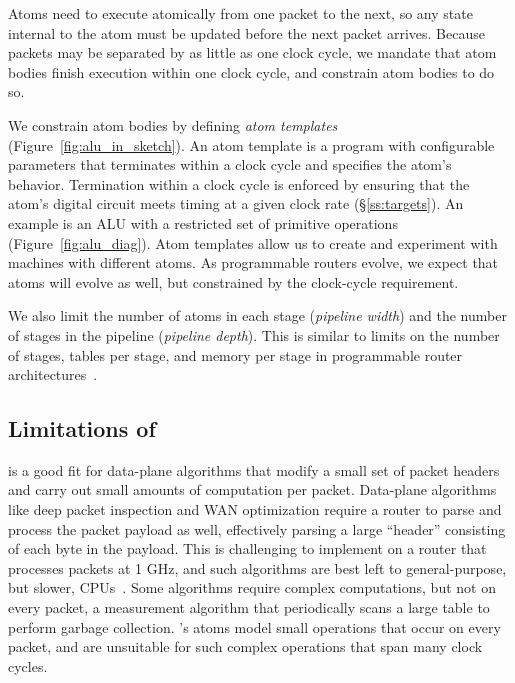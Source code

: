  Atoms need to execute atomically from one
packet to the next, so any state internal to the atom must be updated before
the next packet arrives.  Because packets may be separated by as little as one
clock cycle, we mandate that atom bodies finish execution within one clock
cycle, and constrain atom bodies to do so.

We constrain atom bodies by defining {\it atom templates}
(Figure~\ref{fig:alu_in_sketch}).  An atom template is a program with configurable
parameters that terminates within a clock cycle and specifies the atom's
behavior.  Termination within a clock cycle is enforced by ensuring that the
atom's digital circuit meets timing at a given clock rate (\S\ref{ss:targets}).
An example is an ALU with a restricted set of primitive operations
(Figure~\ref{fig:alu_diag}). Atom templates allow us to create and experiment
with \absmachine machines with different atoms. As programmable routers evolve,
we expect that atoms will evolve as well, but constrained by the clock-cycle
requirement.

 We also limit the number of atoms in each stage
(\textit{pipeline width}) and the number of stages in the pipeline
(\textit{pipeline depth}). This is similar to limits on the number of stages,
tables per stage, and memory per stage in programmable router
architectures~\cite{lavanya_compiler, rmt}.

\subsection{Limitations of \absmachine}
\label{domino_ss:limitations}

\absmachine is a good fit for data-plane algorithms that modify a small set of
packet headers and carry out small amounts of computation per packet.
Data-plane algorithms like deep packet inspection and WAN optimization require
a router to parse and process the packet payload as well, effectively parsing a
large ``header'' consisting of each byte in the payload. This is challenging to
implement on a router that processes packets at 1 GHz, and such algorithms are best left to
general-purpose, but slower, CPUs~\cite{e2}.  Some
algorithms require complex computations, but not on every packet, \eg a
measurement algorithm that periodically scans a large table to perform garbage
collection.  \absmachine's atoms model small operations that occur on every
packet, and are unsuitable for such complex operations that span many clock
cycles.
